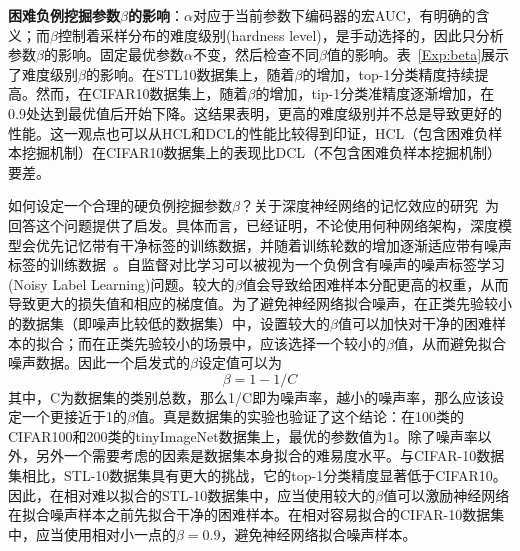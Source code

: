 \begin{table}[h!]
	\centering
	\caption{参数$\beta$的影响}\label{Exp:beta}
\end{table}

\textbf{困难负例挖掘参数$\beta$的影响}：$\alpha$对应于当前参数下编码器的宏AUC，有明确的含义；而$\beta$控制着采样分布的难度级别(hardness level)，是手动选择的，因此只分析参数$\beta$的影响。固定最优参数$\alpha$不变，然后检查不同$\beta$值的影响。表~\ref{Exp:beta}展示了难度级别$\beta$的影响。在STL10数据集上，随着$\beta$的增加，top-1分类精度持续提高。然而，在CIFAR10数据集上，随着$\beta$的增加，tip-1分类准精度逐渐增加，在0.9处达到最优值后开始下降。这结果表明，更高的难度级别并不总是导致更好的性能。这一观点也可以从HCL和DCL的性能比较得到印证，HCL（包含困难负样本挖掘机制）在CIFAR10数据集上的表现比DCL（不包含困难负样本挖掘机制）要差。

如何设定一个合理的硬负例挖掘参数$\beta$？关于深度神经网络的记忆效应的研究~\cite{Arpit:2017:ICML}为回答这个问题提供了启发。具体而言，已经证明，不论使用何种网络架构，深度模型会优先记忆带有干净标签的训练数据，并随着训练轮数的增加逐渐适应带有噪声标签的训练数据~\cite{zhang2021understanding, Han:2018:NIPS}。自监督对比学习可以被视为一个负例含有噪声的噪声标签学习(Noisy Label Learning)问题。较大的$\beta$值会导致给困难样本分配更高的权重，从而导致更大的损失值和相应的梯度值。为了避免神经网络拟合噪声，在正类先验较小的数据集（即噪声比较低的数据集）中，设置较大的$\beta$值可以加快对干净的困难样本的拟合；而在正类先验较小的场景中，应该选择一个较小的$\beta$值，从而避免拟合噪声数据。因此一个启发式的$\beta$设定值可以为
\[\beta = 1-1/C\]
其中，C为数据集的类别总数，那么1/C即为噪声率，越小的噪声率，那么应该设定一个更接近于1的$\beta$值。真是数据集的实验也验证了这个结论：在100类的CIFAR100和200类的tinyImageNet数据集上，最优的参数值为1。除了噪声率以外，另外一个需要考虑的因素是数据集本身拟合的难易度水平。与CIFAR-10数据集相比，STL-10数据集具有更大的挑战，它的top-1分类精度显著低于CIFAR10。因此，在相对难以拟合的STL-10数据集中，应当使用较大的$\beta$值可以激励神经网络在拟合噪声样本之前先拟合干净的困难样本。在相对容易拟合的CIFAR-10数据集中，应当使用相对小一点的$\beta=0.9$，避免神经网络拟合噪声样本。

